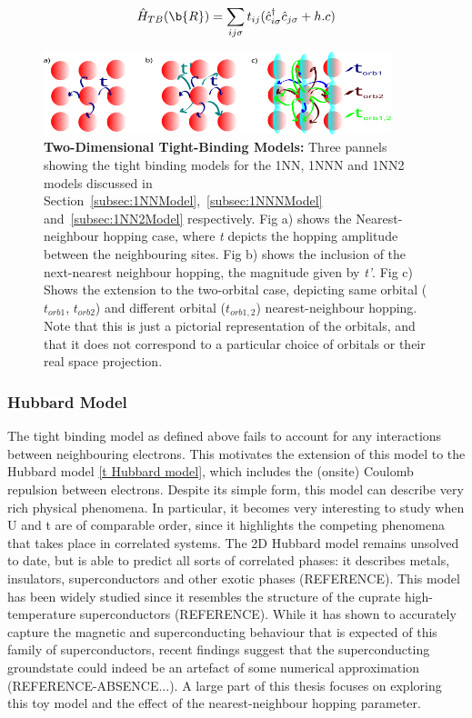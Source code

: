 \documentclass[12pt]{article}
\begin{document}
\begin{equation} \label{TBM}
    \hat{H}_{TB}(\b{R}) = \sum_{ij\sigma} t_{ij}(\hat{c}_{i\sigma}^{\dagger}\hat{c}_{j \sigma} + h.c)
\end{equation}


\begin{figure}[htbp]  %
    \centering
    \includegraphics[width=0.9\textwidth]{2Dhubbardmodel.png}  %
    \caption{\textbf{Two-Dimensional Tight-Binding Models:} Three pannels showing the tight binding models for the 1NN, 1NNN and 1NN2 models discussed in Section~\ref{subsec:1NNModel},~\ref{subsec:1NNNModel} and~\ref{subsec:1NN2Model} respectively. Fig a) shows the Nearest-neighbour hopping case, where \textit{t} depicts the hopping amplitude between the neighbouring sites. Fig b) shows the inclusion of the next-nearest neighbour hopping, the magnitude given by \textit{t'}.
    Fig c) Shows the extension to the two-orbital case, depicting  same orbital ($t_{orb1}$, $t_{orb2}$) and different orbital ($t_{orb1,2}$) nearest-neighbour hopping. Note that this is just a pictorial representation of the orbitals, and that it does not correspond to a particular choice of orbitals or their real space projection. }
    \label{fig:2D Hubbard model}
\end{figure}

\newpage

\subsubsection{Hubbard Model}
\label{subsec: HubbardModel}

The  tight binding model as defined above fails to account for any interactions between neighbouring electrons. This motivates the extension of this model to the Hubbard model \eqref{t Hubbard model}, which includes the (onsite) Coulomb repulsion between electrons. Despite its simple form, this model can describe very rich physical phenomena.
In particular, it becomes very interesting to study when U and t are of comparable order, since it highlights the competing phenomena that takes place in correlated systems. 
The 2D Hubbard model remains unsolved to date, but is able to predict all sorts of correlated phases: it describes metals, insulators, superconductors and other exotic phases (REFERENCE). 
This model has been widely studied since it resembles the structure of the cuprate high-temperature superconductors (REFERENCE). While it has shown to accurately  capture the magnetic and superconducting behaviour that is expected of this family of superconductors, recent findings suggest that the superconducting groundstate 
could indeed be an artefact of some numerical approximation (REFERENCE-ABSENCE...). A large part of this thesis focuses on exploring this toy model and the effect of the nearest-neighbour hopping parameter.
\end{document}
